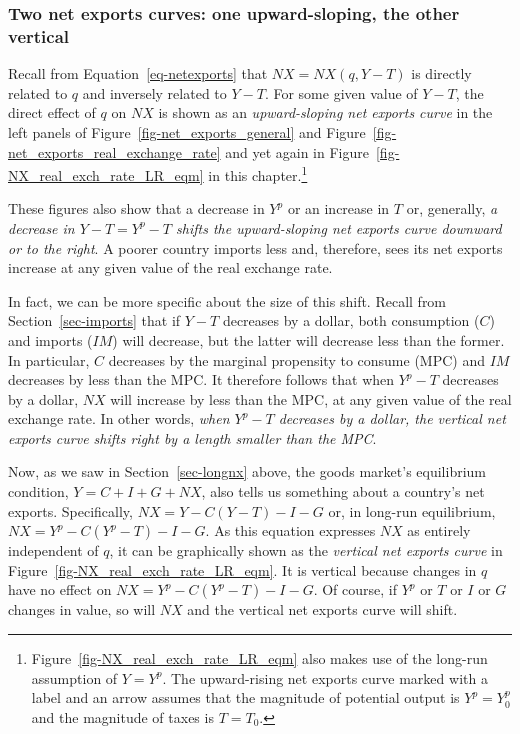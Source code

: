\documentclass[
  letterpaper,
]{book}
\theoremstyle{plain}
\theoremstyle{remark}
\begin{document}
\subsubsection{Two net exports curves: one upward-sloping, the other
vertical}\label{sec-nx-curves}

Recall from Equation~\ref{eq-netexports} that \(NX=NX(q,Y-T)\) is
directly related to \(q\) and inversely related to \(Y-T\). For some
given value of \(Y-T\), the direct effect of \(q\) on \(NX\) is shown as
an \emph{upward-sloping net exports curve} in the left panels of
Figure~\ref{fig-net_exports_general} and
Figure~\ref{fig-net_exports_real_exchange_rate} and yet again in
Figure~\ref{fig-NX_real_exch_rate_LR_eqm} in this chapter.\footnote{Figure~\ref{fig-NX_real_exch_rate_LR_eqm}
  also makes use of the long-run assumption of \(Y=Y^p\). The
  upward-rising net exports curve marked with a label and an arrow
  assumes that the magnitude of potential output is \(Y^p=Y^p_0\) and
  the magnitude of taxes is \(T=T_0\).}

These figures also show that a decrease in \(Y^p\) or an increase in
\(T\) or, generally, \emph{a decrease in \(Y-T=Y^p-T\) shifts the
upward-sloping net exports curve downward or to the right}. A poorer
country imports less and, therefore, sees its net exports increase at
any given value of the real exchange rate.

In fact, we can be more specific about the size of this shift. Recall
from Section~\ref{sec-imports} that if \(Y-T\) decreases by a dollar,
both consumption (\(C\)) and imports (\(IM\)) will decrease, but the
latter will decrease less than the former. In particular, \(C\)
decreases by the marginal propensity to consume (MPC) and \(IM\)
decreases by less than the MPC. It therefore follows that when \(Y^p-T\)
decreases by a dollar, \(NX\) will increase by less than the MPC, at any
given value of the real exchange rate. In other words, \emph{when
\(Y^p-T\) decreases by a dollar, the vertical net exports curve shifts
right by a length smaller than the MPC}.

Now, as we saw in Section~\ref{sec-longnx} above, the goods market's
equilibrium condition, \(Y=C+I+G+NX\), also tells us something about a
country's net exports. Specifically, \(NX=Y-C(Y-T)-I-G\) or, in long-run
equilibrium, \(NX=Y^p-C(Y^p-T)-I-G\). As this equation expresses \(NX\)
as entirely independent of \(q\), it can be graphically shown as the
\emph{vertical net exports curve} in
Figure~\ref{fig-NX_real_exch_rate_LR_eqm}. It is vertical because
changes in \(q\) have no effect on \(NX=Y^p-C(Y^p-T)-I-G\). Of course,
if \(Y^p\) or \(T\) or \(I\) or \(G\) changes in value, so will \(NX\)
and the vertical net exports curve will shift.
\end{document}
